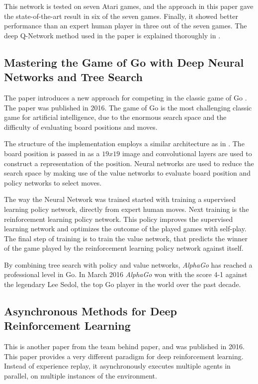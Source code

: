 This network is tested on seven Atari games, and the approach in this paper gave the state-of-the-art result in six of the seven games. Finally, it showed better performance than an expert human player in three out of the seven games. The deep Q-Network method used in the paper is explained thoroughly in .

\subsection{Mastering the Game of Go with Deep Neural Networks and Tree Search}
The paper \cite{Silver_2016} introduces a new approach for competing in the classic game of Go \cite{explain_go}. The paper was published in 2016. The game of Go is the most challenging classic game for artificial intelligence, due to the enormous search space and the difficulty of evaluating board positions and moves.

The structure of the implementation employs a similar architecture as in \cite{DBLP:journals/corr/MnihKSGAWR13}. The board position is passed in as a $19 x 19$ image and convolutional layers are used to construct a representation of the position. Neural networks are used to reduce the search space by making use of the value networks to evaluate board position and policy networks to select moves.

The way the Neural Network was trained started with training a supervised learning policy network, directly from expert human moves. Next training is the reinforcement learning policy network. This policy improves the supervised learning network and optimizes the outcome of the played games with self-play. The final step of training is to train the value network, that predicts the winner of the game played by the reinforcement learning policy network against itself. 

By combining tree search with policy and value networks, \textit{AlphaGo} has reached a professional level in Go. In March 2016 \textit{AlphaGo} won with the score 4-1 against the legendary Lee Sedol, the top Go player in the world over the past decade.

\subsection{Asynchronous Methods for Deep Reinforcement Learning}\label{AsyncMeths}
This is another paper \cite{DBLP:journals/corr/MnihBMGLHSK16} from the team behind \cite{DBLP:journals/corr/MnihKSGAWR13} paper, and was published in 2016. This paper provides a very different paradigm for deep reinforcement learning. Instead of experience replay, it asynchronously executes multiple agents in parallel, on multiple instances of the environment. 

